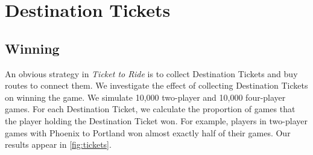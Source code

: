 \newpage
\section{Destination Tickets}

\subsection{Winning}
An obvious strategy in \textit{Ticket to Ride} is to collect
Destination Tickets and buy routes to connect them.
We investigate the effect of collecting Destination Tickets
on winning the game.
We simulate 10,000 two-player and 10,000 four-player games.
For each Destination Ticket, we calculate the proportion of 
games that the player holding the Destination Ticket won.
For example, players in two-player games with Phoenix to Portland
won almost exactly half of their games.
Our results appear in \cref{fig:tickets}.

